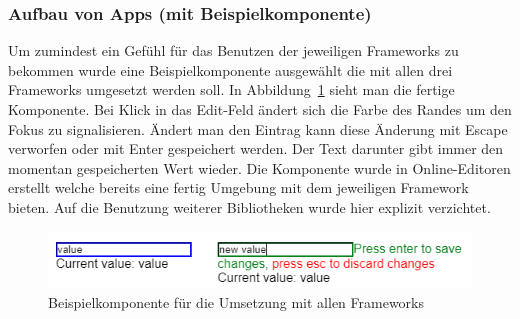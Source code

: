 \subsubsection{Aufbau von Apps (mit Beispielkomponente)}
Um zumindest ein Gefühl für das Benutzen der jeweiligen Frameworks zu bekommen wurde eine Beispielkomponente ausgewählt die mit allen drei Frameworks umgesetzt werden soll. In Abbildung~\ref{fig:example_component} sieht man die fertige Komponente. Bei Klick in das Edit-Feld ändert sich die Farbe des Randes um den Fokus zu signalisieren. Ändert man den Eintrag kann diese Änderung mit Escape verworfen oder mit Enter gespeichert werden. Der Text darunter gibt immer den momentan gespeicherten Wert wieder. Die Komponente wurde in Online-Editoren erstellt welche bereits eine fertig Umgebung mit dem jeweiligen Framework bieten. Auf die Benutzung weiterer Bibliotheken wurde hier explizit verzichtet.

\begin{figure}
    \centering
    \captionsetup{justification=centering}
    \includegraphics{figures/example_component.png}
        \caption{Beispielkomponente für die Umsetzung mit allen Frameworks}\label{fig:example_component}
\end{figure}


